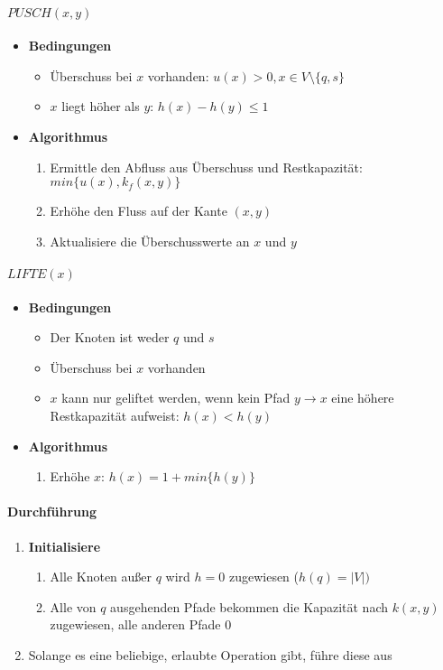 \paragraph{\(PUSCH(x,y)\)}
\begin{itemize}
	\item \textbf{Bedingungen}
	\begin{itemize}
		\item Überschuss bei \(x\) vorhanden: \(u(x) > 0, x \in V \setminus \{q,s\}\)
		\item \(x\) liegt höher als \(y\): \(h(x) - h(y) \leq 1\)
	\end{itemize}
	\item \textbf{Algorithmus}
	\begin{enumerate}
		\item Ermittle den Abfluss aus Überschuss und Restkapazität: \(min\{u(x), k_f(x,y)\}\)
		\item Erhöhe den Fluss auf der Kante \((x,y)\)
		\item Aktualisiere die Überschusswerte an \(x\) und \(y\)
	\end{enumerate}
\end{itemize}

\paragraph{\(LIFTE(x)\)}
\begin{itemize}
	\item \textbf{Bedingungen}
	\begin{itemize}
		\item Der Knoten ist weder \(q\) und \(s\)
		\item Überschuss bei \(x\) vorhanden
		\item \(x\) kann nur geliftet werden, wenn kein Pfad \(y \rightarrow x\) eine höhere Restkapazität aufweist: \(h(x) < h(y)\)
	\end{itemize}
	\item \textbf{Algorithmus}
	\begin{enumerate}
		\item Erhöhe \(x\): \(h(x) = 1 + min\{h(y)\}\)
	\end{enumerate}
\end{itemize}

\paragraph{Durchführung}
\begin{enumerate}
	\item \textbf{Initialisiere}
	\begin{enumerate}
		\item Alle Knoten außer \(q\) wird \(h=0\) zugewiesen (\(h(q) = |V|)\)
		\item Alle von \(q\) ausgehenden Pfade bekommen die Kapazität nach \(k(x,y)\) zugewiesen, alle anderen Pfade \(0\)
	\end{enumerate}
	\item Solange es eine beliebige, erlaubte Operation gibt, führe diese aus
\end{enumerate}

